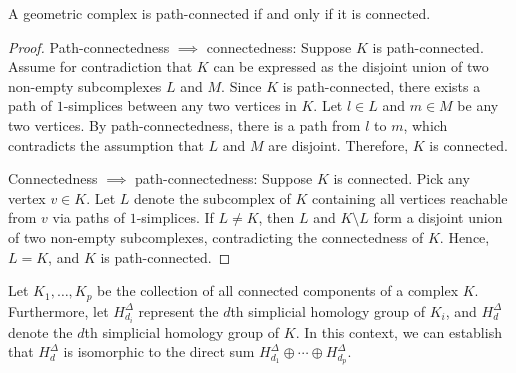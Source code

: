 \begin{lemma}
    \label{pathconnect}
    A geometric complex is path-connected if and only if it is connected.
\end{lemma}

\begin{proof}
    Path-connectedness $\implies$ connectedness: Suppose $K$ is path-connected. Assume for contradiction that $K$ can be expressed as the disjoint union of two non-empty subcomplexes $L$ and $M$. Since $K$ is path-connected, there exists a path of $1$-simplices between any two vertices in $K$. Let $l \in L$ and $m \in M$ be any two vertices. By path-connectedness, there is a path from $l$ to $m$, which contradicts the assumption that $L$ and $M$ are disjoint. Therefore, $K$ is connected.

    Connectedness $\implies$ path-connectedness: Suppose $K$ is connected. Pick any vertex $v \in K$. Let $L$ denote the subcomplex of $K$ containing all vertices reachable from $v$ via paths of $1$-simplices. If $L \neq K$, then $L$ and $K \setminus L$ form a disjoint union of two non-empty subcomplexes, contradicting the connectedness of $K$. Hence, $L = K$, and $K$ is path-connected.
\end{proof}

\begin{theorem}
    \label{decomptheorem}
    Let $K_1, \ldots, K_p$ be the collection of all connected components of a complex $K$. Furthermore, let $H^\Delta_{d_i}$ represent the $d$th simplicial homology group of $K_i$, and $H^\Delta_d$ denote the $d$th simplicial homology group of $K$. In this context, we can establish that $H^\Delta_d$ is isomorphic to the direct sum $H^\Delta_{d_1} \oplus \cdots \oplus H^\Delta_{d_p}$.
\end{theorem}

